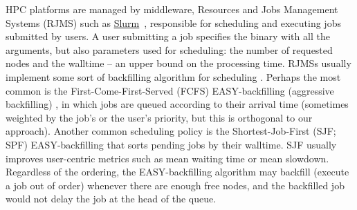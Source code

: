 \documentclass[runningheads]{llncs}
\begin{document}
HPC platforms are managed by middleware, Resources and Jobs Management Systems (RJMS) such as \href{https://slurm.schedmd.com/overview.html}{Slurm}~\cite{10.1007/10968987_3}, responsible for scheduling and executing jobs submitted by users. 
A user submitting a job specifies the binary with all the arguments, but also parameters used for scheduling: the number of requested nodes and the walltime -- an upper bound on the processing time.
RJMSs usually implement some sort of backfilling algorithm for scheduling \cite{1374857}. Perhaps the most common is the First-Come-First-Served (FCFS) EASY-backfilling (aggressive backfilling) \cite{10.1007/3-540-36180-4_4}, in which jobs are queued according to their arrival time (sometimes weighted by the job's or the user's priority, but this is orthogonal to our approach). Another common scheduling policy is the Shortest-Job-First (SJF; SPF) EASY-backfilling \cite{carastansantos:hal-02237895} that sorts pending jobs by their walltime. SJF usually improves user-centric metrics such as mean waiting time or mean slowdown. Regardless of the ordering, the EASY-backfilling algorithm may backfill (execute a job out of order) whenever there are enough free nodes, and the backfilled job would not delay the job at the head of the queue.

\end{document}
